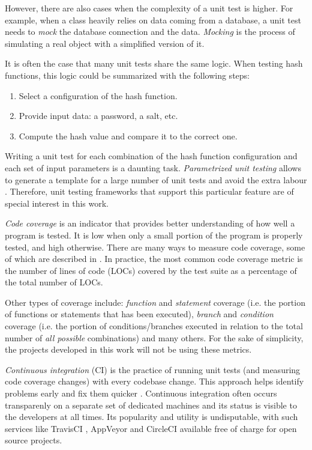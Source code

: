 However, there are also cases when the complexity of a unit test is higher. For example, when a class heavily relies on data coming from a database, a unit test needs to \emph{mock} the database connection and the data. \emph{Mocking} is the process of simulating a real object with a simplified version of it.

It is often the case that many unit tests share the same logic. When testing hash functions, this logic could be summarized with the following steps:

\begin{enumerate}
    \item Select a configuration of the hash function.
    \item Provide input data: a password, a salt, etc.
    \item Compute the hash value and compare it to the correct one.
   \end{enumerate}

Writing a unit test for each combination of the hash function configuration and each set of input parameters is a daunting task. \emph{Parametrized unit testing} allows to generate a template for a large number of unit tests and avoid the extra labour \cite{tillmann:2010:parametrized-unit-tests-rock}. Therefore, unit testing frameworks that support this particular feature are of special interest in this work.

\emph{Code coverage} is an indicator that provides better understanding of how well a program is tested. It is low when only a small portion of the program is properly tested, and high otherwise. There are many ways to measure code coverage, some of which are described in \cite{elberzhager:2012:reducing-effort}. In practice, the most common code coverage metric is the number of lines of code (LOCs) covered by the test suite as a percentage of the total number of LOCs.

Other types of coverage include: \emph{function} and \emph{statement} coverage (i.e. the portion of functions or statements that has been executed), \emph{branch} and \emph{condition} coverage (i.e. the portion of conditions/branches executed in relation to the total number of \emph{all possible} combinations) and many others. For the sake of simplicity, the projects developed in this work will not be using these metrics.

\emph{Continuous integration} (CI) is the practice of running unit tests (and measuring code coverage changes) with every codebase change. This approach helps identify problems early and fix them quicker \cite{williams:2010:unit-tests-rock}. Continuous integration often occurs transparenly on a separate set of dedicated machines and its status is visible to the developers at all times. Its popularity and utility is undisputable, with such services like TravisCI \cite{travis:2017:homepage}, AppVeyor \cite{appveyor:2017:homepage} and CircleCI \cite{circleci:2017:homepage} available free of charge for open source projects.

